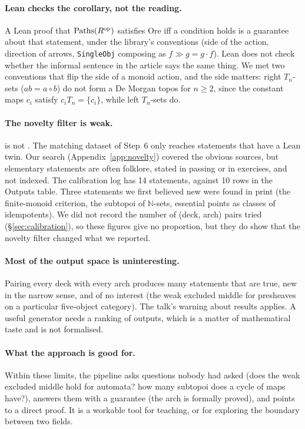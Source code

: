 \paragraph{Lean checks the corollary, not the reading.} A Lean proof that $\mathrm{Paths}(R^{\mathrm{op}})$ satisfies Ore iff a condition holds is a guarantee about that statement, under the library's conventions (side of the action, direction of arrows, \texttt{SingleObj} composing as $f\gg g = g\cdot f$). Lean does not check whether the informal sentence in the article says the same thing. We met two conventions that flip the side of a monoid action, and the side matters: right $T_n$-sets ($ab = a\circ b$) do not form a De Morgan topos for $n\ge 2$, since the constant maps $c_i$ satisfy $c_iT_n = \{c_i\}$, while left $T_n$-sets do.

\paragraph{The novelty filter is weak.}  is not . The matching dataset of Step~6 only reaches statements that have a Lean twin. Our search (Appendix~\ref{app:novelty}) covered the obvious sources, but elementary statements are often folklore, stated in passing or in exercises, and not indexed. The calibration log has 14 statements, against 10 rows in the Outputs table. Three statements we first believed new were found in print (the finite-monoid criterion, the subtopoi of $\mathbb N$-sets, essential points as classes of idempotents). We did not record the number of (deck, arch) pairs tried (\S\ref{sec:calibration}), so these figures give no proportion, but they do show that the novelty filter changed what we reported.

\paragraph{Most of the output space is uninteresting.} Pairing every deck with every arch produces many statements that are true, new in the narrow sense, and of no interest (the weak excluded middle for presheaves on a particular five-object category). The talk's warning about  results applies. A useful generator needs a ranking of outputs, which is a matter of mathematical taste and is not formalised.

\paragraph{What the approach is good for.} Within these limits, the pipeline asks questions nobody had asked (does the weak excluded middle hold for automata? how many subtopoi does a cycle of maps have?), answers them with a guarantee (the arch is formally proved), and points to a direct proof. It is a workable tool for teaching, or for exploring the boundary between two fields.

